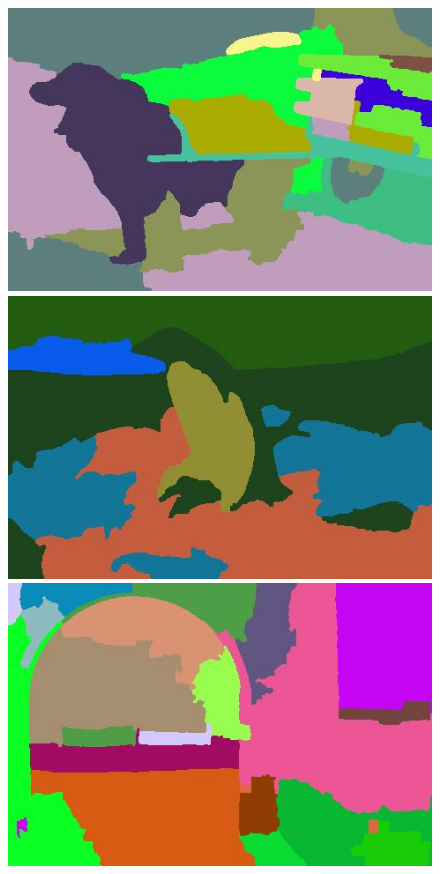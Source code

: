 \begin{figure}[h]
{\begin{minipage}[b]{0.13\linewidth}
\includegraphics[width=1\linewidth]{figures/img/SFFCM/SFFCM_247012.jpg}
\includegraphics[width=1\linewidth]{figures/img/SFFCM/SFFCM_106005.jpg}
\includegraphics[width=1\linewidth]{figures/img/SFFCM/SFFCM_5096.jpg}

\end{minipage}}
\end{figure}
